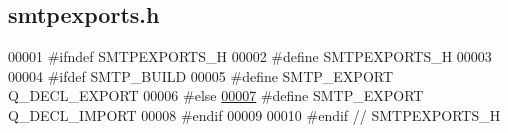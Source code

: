 \hypertarget{smtpexports_8h_source}{}\subsection{smtpexports.\+h}
\label{smtpexports_8h_source}

\begin{DoxyCode}
00001 \textcolor{preprocessor}{#ifndef SMTPEXPORTS\_H}
00002 \textcolor{preprocessor}{#define SMTPEXPORTS\_H}
00003 
00004 \textcolor{preprocessor}{#ifdef SMTP\_BUILD}
00005 \textcolor{preprocessor}{#define SMTP\_EXPORT Q\_DECL\_EXPORT}
00006 \textcolor{preprocessor}{#else}
\hyperlink{smtpexports_8h_ac580c9660cb24a34b13807f4eb0e1bd0}{00007} \textcolor{preprocessor}{#define SMTP\_EXPORT Q\_DECL\_IMPORT}
00008 \textcolor{preprocessor}{#endif}
00009 
00010 \textcolor{preprocessor}{#endif // SMTPEXPORTS\_H}
\end{DoxyCode}
